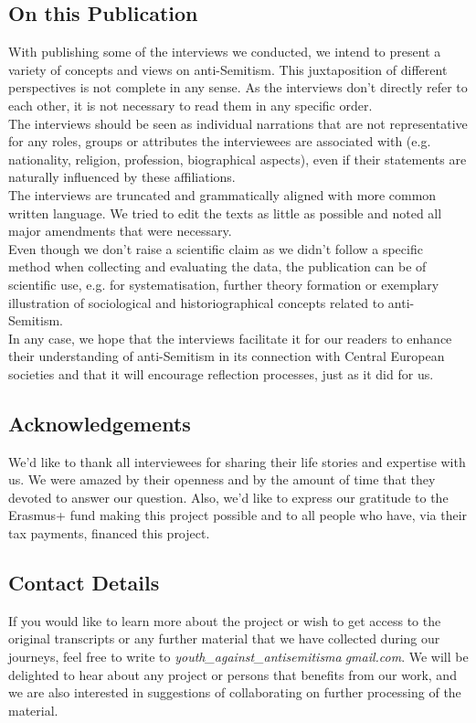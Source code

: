 \subsection*{On this Publication}
With publishing some of the interviews we conducted, we intend to present a variety of concepts and views on anti-Semitism. This juxtaposition of different perspectives is not complete in any sense. As the interviews don’t directly refer to each other, it is not necessary to read them in any specific order.\\ 
The interviews should be seen as individual narrations that are not representative for any roles, groups or attributes the interviewees are associated with (e.g. nationality, religion, profession, biographical aspects), even if their statements are naturally influenced by these affiliations. \\
The interviews are truncated and grammatically aligned with more common written language. We tried to edit the texts as little as possible and noted all major amendments that were necessary. \\
Even though we don’t raise a scientific claim as we didn’t follow a specific method when collecting and evaluating the data, the publication can be of scientific use, e.g. for systematisation, further theory formation or exemplary illustration of sociological and historiographical concepts related to anti-Semitism. \\
In any case, we hope that the interviews facilitate it for our readers to enhance their understanding of anti-Semitism in its connection with Central European societies and that it will encourage reflection processes, just as it did for us. 
\subsection*{Acknowledgements}
We’d like to thank all interviewees for sharing their life stories and expertise with us. We were amazed by their openness and by the amount of time that they devoted to answer our question. Also, we'd like to express our gratitude to the Erasmus+ fund making this project possible and to all people who have, via their tax payments, financed this project.
\subsection{Contact Details}
If you would like to learn more about the project or wish to get access to the original transcripts or any further material that we have collected during our journeys, feel free to write to \textit{youth\_against\_antisemitism\textcircled{a}gmail.com}. We will be delighted to hear about any project or persons that benefits from our work, and we are also interested in suggestions of collaborating on further processing of the material.

